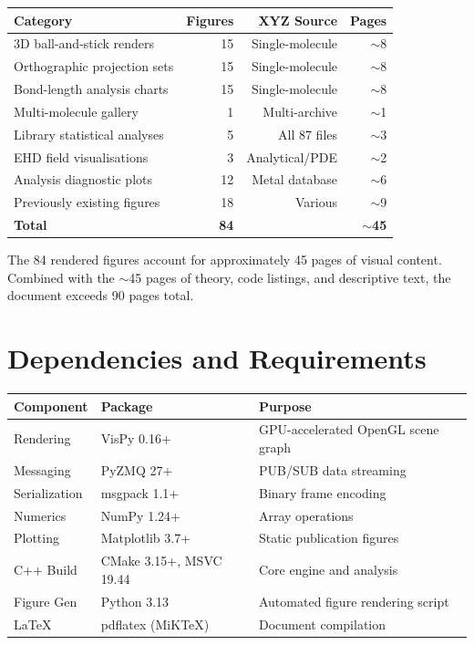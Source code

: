 \documentclass[11pt,a4paper]{article}
\begin{document}
\begin{center}
\begin{tabular}{lrrr}
\toprule
\textbf{Category} & \textbf{Figures} & \textbf{XYZ Source} & \textbf{Pages} \\
\midrule
3D ball-and-stick renders      & 15 & Single-molecule & $\sim$8 \\
Orthographic projection sets   & 15 & Single-molecule & $\sim$8 \\
Bond-length analysis charts    & 15 & Single-molecule & $\sim$8 \\
Multi-molecule gallery         & 1  & Multi-archive   & $\sim$1 \\
Library statistical analyses   & 5  & All 87 files    & $\sim$3 \\
EHD field visualisations       & 3  & Analytical/PDE  & $\sim$2 \\
Analysis diagnostic plots      & 12 & Metal database  & $\sim$6 \\
Previously existing figures    & 18 & Various         & $\sim$9 \\
\midrule
\textbf{Total}                 & \textbf{84} & & $\sim$\textbf{45} \\
\bottomrule
\end{tabular}
\end{center}

\noindent The 84 rendered figures account for approximately 45 pages of
visual content.  Combined with the $\sim$45 pages of theory, code
listings, and descriptive text, the document exceeds 90 pages total.

\section{Dependencies and Requirements}
\label{sec:deps}

\begin{center}
\begin{tabular}{llp{8cm}}
\toprule
\textbf{Component} & \textbf{Package} & \textbf{Purpose} \\
\midrule
Rendering   & VisPy 0.16+       & GPU-accelerated OpenGL scene graph \\
Messaging   & PyZMQ 27+         & PUB/SUB data streaming \\
Serialization & msgpack 1.1+    & Binary frame encoding \\
Numerics    & NumPy 1.24+       & Array operations \\
Plotting    & Matplotlib 3.7+   & Static publication figures \\
C++ Build   & CMake 3.15+, MSVC 19.44 & Core engine and analysis \\
Figure Gen  & Python 3.13       & Automated figure rendering script \\
LaTeX       & pdflatex (MiKTeX) & Document compilation \\
\bottomrule
\end{tabular}
\end{center}
\end{document}
